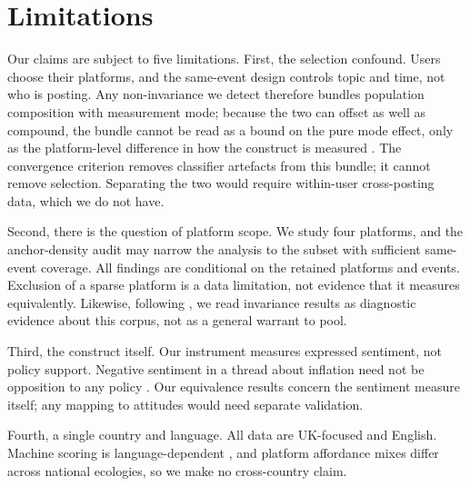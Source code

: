 
\section{Limitations}
\label{sec:limitations}

Our claims are subject to five limitations. First, the selection confound. Users choose their platforms, and the same-event design controls topic and time, not who is posting. Any non-invariance we detect therefore bundles population composition with measurement mode; because the two can offset as well as compound, the bundle cannot be read as a bound on the pure mode effect, only as the platform-level difference in how the construct is measured \citep{sen2021}. The convergence criterion \citep{czarnek2022} removes classifier artefacts from this bundle; it cannot remove selection. Separating the two would require within-user cross-posting data, which we do not have.

Second, there is the question of platform scope. We study four platforms, and the anchor-density audit may narrow the analysis to the subset with sufficient same-event coverage. All findings are conditional on the retained platforms and events. Exclusion of a sparse platform is a data limitation, not evidence that it measures equivalently. Likewise, following \citet{robitzsch2023}, we read invariance results as diagnostic evidence about this corpus, not as a general warrant to pool.

Third, the construct itself. Our instrument measures expressed sentiment, not policy support. Negative sentiment in a thread about inflation need not be opposition to any policy \citep{oconnor2010}. Our equivalence results concern the sentiment measure itself; any mapping to attitudes would need separate validation.

Fourth, a single country and language. All data are UK-focused and English. Machine scoring is language-dependent \citep{nogara2025}, and platform affordance mixes differ across national ecologies, so we make no cross-country claim.

